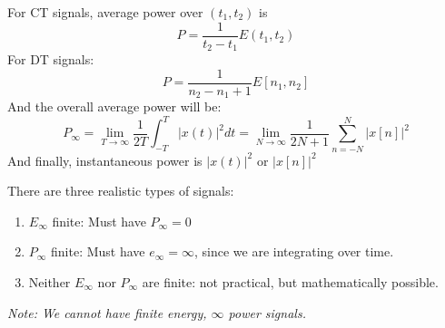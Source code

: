 \documentclass[nobib]{tufte-handout}
\begin{document}
\begin{enumerate}
\begin{itemize}
                    For CT signals, average power over $(t_1,t_2)$ is \begin{equation*}
                        P = \frac{1}{t_2-t_1}E(t_1,t_2)
                    \end{equation*}
                    For DT signals:
                    \begin{equation*}
                        P = \frac{1}{n_2-n_1+1}E[n_1,n_2]
                    \end{equation*}
                    And the overall average power will be:\begin{equation*}
                        P_\infty = \lim_{T\rightarrow\infty}\frac{1}{2T}\int_{-T}^{T}|x(t)|^2 dt = \lim_{N\rightarrow\infty}\frac{1}{2N+1}\sum_{n=-N}^{N}|x[n]|^2
                    \end{equation*}
                    And finally, instantaneous power is $|x(t)|^2$ or $|x[n]|^2$
          \end{itemize}
          There are three realistic types of signals:\begin{enumerate}
            \item $E_\infty$ finite: Must have $P_\infty =0$
            \item $P_\infty$ finite: Must have $e_\infty = \infty$, since we are integrating over time.
            \item Neither $E_\infty$ nor $P_\infty$ are finite: not practical, but mathematically possible.
          \end{enumerate}
          \textit{Note: We cannot have finite energy, $\infty$ power signals.}
          
\end{enumerate}
\end{document}
